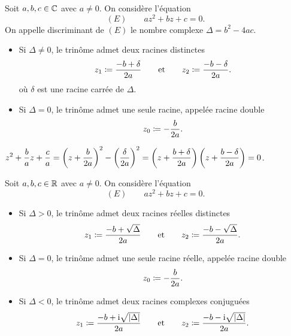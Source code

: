 \documentclass{magnolia}
\begin{document}
\begin{proposition}[utile=-3]
Soit $a,b,c\in\mathbb{C}$ avec $a\neq 0$.
On considère l'équation
  \[(E) \qquad az^2+bz+c=0.\]
  On appelle discriminant de $(E)$ le nombre complexe $\Delta=b^2-4ac$.
  \begin{itemize}
  \item Si $\Delta\not=0$, le trinôme admet deux racines distinctes
    \[z_1\coloneqq\frac{-b+\delta}{2a} \qquad \text{et} \qquad
      z_2\coloneqq\frac{-b-\delta}{2a}.\]
    où $\delta$ est une racine carrée de $\Delta$.
  \item Si $\Delta=0$, le trinôme admet une seule racine, appelée racine
    double
    \[z_0\coloneqq-\frac{b}{2a}.\]
  \end{itemize}
\end{proposition}

\begin{preuve}
$\displaystyle z^2+\frac{b}{a}z+\frac{c}{a}=\left(z+\frac{b}{2a}\right)^2-\left(\frac{\delta}{2a}\right)^2=\left(z+\frac{b+\delta}{2a}\right)\left(z+\frac{b-\delta}{2a}\right)=0$.
\end{preuve}

\begin{remarqueUnique}
\remarque Soit $a,b,c\in\mathbb{R}$ avec $a\neq 0$. On considère l'équation
  \[(E) \qquad az^2+bz+c=0.\]
  \begin{itemize}
  \item Si $\Delta>0$, le trinôme admet deux racines réelles distinctes
    \[z_1\coloneqq\frac{-b+\sqrt{\Delta}}{2a} \qquad \text{et} \qquad
      z_2\coloneqq\frac{-b-\sqrt{\Delta}}{2a}.\]
  \item Si $\Delta=0$, le trinôme admet une seule racine réelle, appelée racine
    double
    \[z_0\coloneqq-\frac{b}{2a}.\]
  \item Si $\Delta<0$, le trinôme admet deux racines complexes conjuguées
    \[z_1\coloneqq\frac{-b+{\rm i}\sqrt{\left|\Delta\right|}}{2a} \qquad \text{et} \qquad
      z_2\coloneqq\frac{-b-{\rm i}\sqrt{\left|\Delta\right|}}{2a}.\]
  \end{itemize}     
\end{remarqueUnique}
\end{document}
